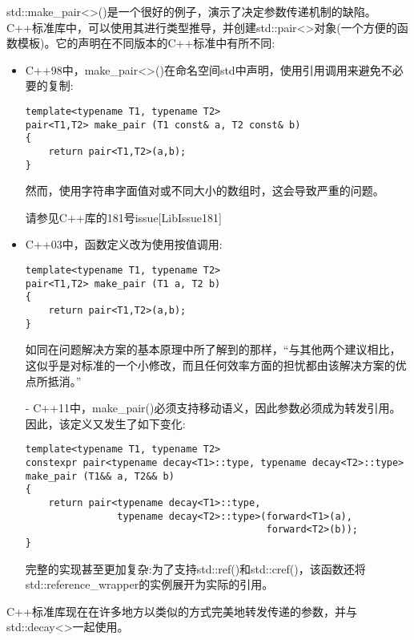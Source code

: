 std::make\_pair<>()是一个很好的例子，演示了决定参数传递机制的缺陷。C++标准库中，可以使用其进行类型推导，并创建std::pair<>对象(一个方便的函数模板)。它的声明在不同版本的C++标准中有所不同:

\begin{itemize}
\item
C++98中，make\_pair<>()在命名空间std中声明，使用引用调用来避免不必要的复制:

\begin{lstlisting}[style=styleCXX]
template<typename T1, typename T2>
pair<T1,T2> make_pair (T1 const& a, T2 const& b)
{
	return pair<T1,T2>(a,b);
}
\end{lstlisting}

然而，使用字符串字面值对或不同大小的数组时，这会导致严重的问题。

\begin{tcolorbox}[colback=webgreen!5!white,colframe=webgreen!75!black]
\hspace*{0.75cm}请参见C++库的181号issue[LibIssue181]
\end{tcolorbox}

\item
C++03中，函数定义改为使用按值调用:

\begin{lstlisting}[style=styleCXX]
template<typename T1, typename T2>
pair<T1,T2> make_pair (T1 a, T2 b)
{
	return pair<T1,T2>(a,b);
}
\end{lstlisting}

如同在问题解决方案的基本原理中所了解到的那样，“与其他两个建议相比，这似乎是对标准的一个小修改，而且任何效率方面的担忧都由该解决方案的优点所抵消。”

\item[-]
C++11中，make\_pair()必须支持移动语义，因此参数必须成为转发引用。因此，该定义又发生了如下变化:

\begin{lstlisting}[style=styleCXX]
template<typename T1, typename T2>
constexpr pair<typename decay<T1>::type, typename decay<T2>::type>
make_pair (T1&& a, T2&& b)
{
	return pair<typename decay<T1>::type,
				typename decay<T2>::type>(forward<T1>(a),
										  forward<T2>(b));
}
\end{lstlisting}

完整的实现甚至更加复杂:为了支持std::ref()和std::cref()，该函数还将std::reference\_wrapper的实例展开为实际的引用。
\end{itemize}

C++标准库现在在许多地方以类似的方式完美地转发传递的参数，并与std::decay<>一起使用。


















